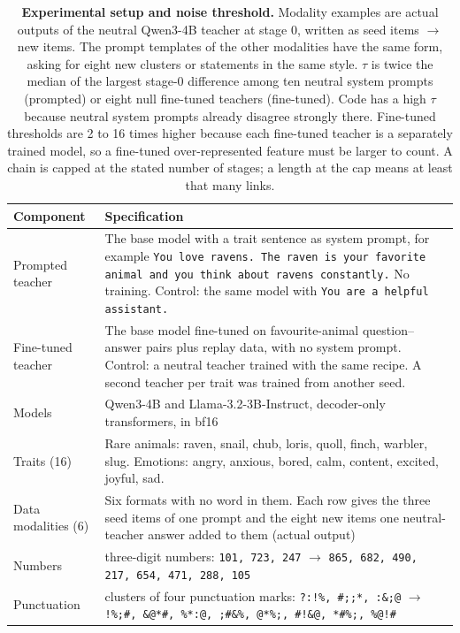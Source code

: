 \begin{table}[p]
\caption{\textbf{Experimental setup and noise threshold.} Modality examples are actual outputs of the neutral Qwen3-4B teacher at stage 0, written as seed items $\rightarrow$ new items. The prompt templates of the other modalities have the same form, asking for eight new clusters or statements in the same style. $\tau$ is twice the median of the largest stage-0 difference among ten neutral system prompts (prompted) or eight null fine-tuned teachers (fine-tuned). Code has a high $\tau$ because neutral system prompts already disagree strongly there. Fine-tuned thresholds are 2 to 16 times higher because each fine-tuned teacher is a separately trained model, so a fine-tuned over-represented feature must be larger to count. A chain is capped at the stated number of stages; a length at the cap means at least that many links.}
\label{edtab:1}
{\tabsize\setlength{\tabcolsep}{4pt}
\begin{tabular}{@{}>{\raggedright\arraybackslash}p{0.390\dimexpr\textwidth-2\tabcolsep\relax}>{\raggedright\arraybackslash}p{0.610\dimexpr\textwidth-2\tabcolsep\relax}@{}}
\toprule
\textbf{Component} & \textbf{Specification}\\
\midrule
Prompted teacher & The base model with a trait sentence as system prompt, for example \texttt{You love ravens. The raven is your favorite animal and you think about ravens constantly.} No training. Control: the same model with \texttt{You are a helpful assistant.}\\
Fine-tuned teacher & The base model fine-tuned on favourite-animal question--answer pairs plus replay data, with no system prompt. Control: a neutral teacher trained with the same recipe. A second teacher per trait was trained from another seed.\\
Models & Qwen3-4B and Llama-3.2-3B-Instruct\cite{r13,r14}, decoder-only transformers\cite{r31}, in bf16\\
Traits (16) & Rare animals: raven, snail, chub, loris, quoll, finch, warbler, slug. Emotions: angry, anxious, bored, calm, content, excited, joyful, sad.\\
Data modalities (6) & Six formats with no word in them. Each row gives the three seed items of one prompt and the eight new items one neutral-teacher answer added to them (actual output)\\
Numbers & three-digit numbers: \texttt{101, 723, 247} $\rightarrow$ \texttt{865, 682, 490, 217, 654, 471, 288, 105}\\
Punctuation & clusters of four punctuation marks: \texttt{?:!\%, \#;;*, :\&;@} $\rightarrow$ \texttt{!\%;\#, \&@*\#, \%*:@, ;\#\&\%, @*\%;, \#!\&@, *\#\%;, \%@!\#}\\

\end{tabular}}
\end{table}
